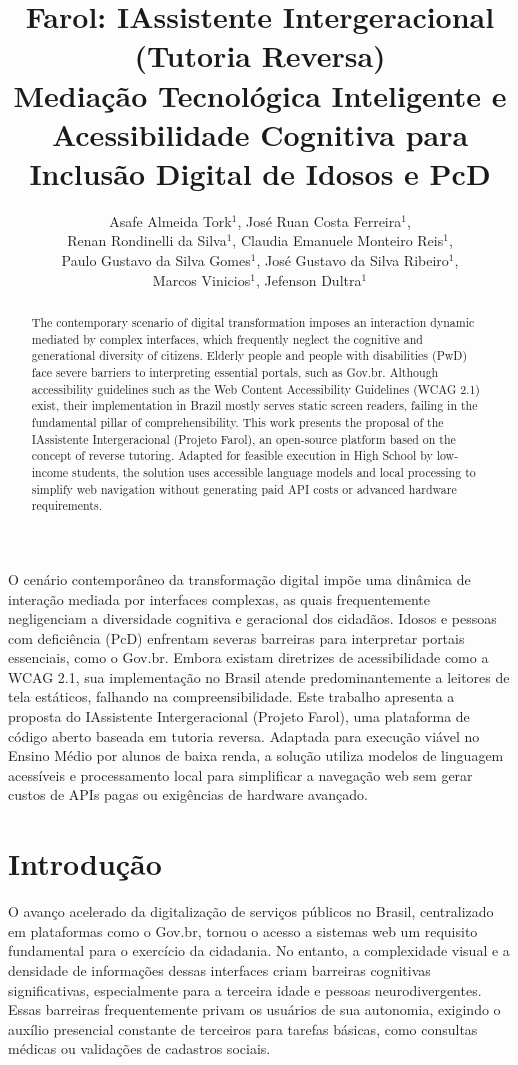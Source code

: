 \documentclass[12pt]{article}
\title{Farol: IAssistente Intergeracional (Tutoria Reversa) \\ Mediação Tecnológica Inteligente e Acessibilidade Cognitiva para Inclusão Digital de Idosos e PcD}
\author{Asafe Almeida Tork$^1$, José Ruan Costa Ferreira$^1$, \\ Renan Rondinelli da Silva$^1$, Claudia Emanuele Monteiro Reis$^1$, \\ Paulo Gustavo da Silva Gomes$^1$, José Gustavo da Silva Ribeiro$^1$, \\ Marcos Vinicios$^1$, Jefenson Dultra$^1$}
\begin{document}
\maketitle

\begin{abstract}
  The contemporary scenario of digital transformation imposes an interaction dynamic mediated by complex interfaces, which frequently neglect the cognitive and generational diversity of citizens. Elderly people and people with disabilities (PwD) face severe barriers to interpreting essential portals, such as Gov.br. Although accessibility guidelines such as the Web Content Accessibility Guidelines (WCAG 2.1) exist, their implementation in Brazil mostly serves static screen readers, failing in the fundamental pillar of comprehensibility. This work presents the proposal of the IAssistente Intergeracional (Projeto Farol), an open-source platform based on the concept of reverse tutoring. Adapted for feasible execution in High School by low-income students, the solution uses accessible language models and local processing to simplify web navigation without generating paid API costs or advanced hardware requirements.
\end{abstract}

\begin{resumo}
  O cenário contemporâneo da transformação digital impõe uma dinâmica de interação mediada por interfaces complexas, as quais frequentemente negligenciam a diversidade cognitiva e geracional dos cidadãos. Idosos e pessoas com deficiência (PcD) enfrentam severas barreiras para interpretar portais essenciais, como o Gov.br. Embora existam diretrizes de acessibilidade como a WCAG 2.1, sua implementação no Brasil atende predominantemente a leitores de tela estáticos, falhando na compreensibilidade. Este trabalho apresenta a proposta do IAssistente Intergeracional (Projeto Farol), uma plataforma de código aberto baseada em tutoria reversa. Adaptada para execução viável no Ensino Médio por alunos de baixa renda, a solução utiliza modelos de linguagem acessíveis e processamento local para simplificar a navegação web sem gerar custos de APIs pagas ou exigências de hardware avançado.
\end{resumo}

\section{Introdução}

O avanço acelerado da digitalização de serviços públicos no Brasil, centralizado em plataformas como o Gov.br, tornou o acesso a sistemas web um requisito fundamental para o exercício da cidadania. No entanto, a complexidade visual e a densidade de informações dessas interfaces criam barreiras cognitivas significativas, especialmente para a terceira idade e pessoas neurodivergentes. Essas barreiras frequentemente privam os usuários de sua autonomia, exigindo o auxílio presencial constante de terceiros para tarefas básicas, como consultas médicas ou validações de cadastros sociais.
\end{document}
